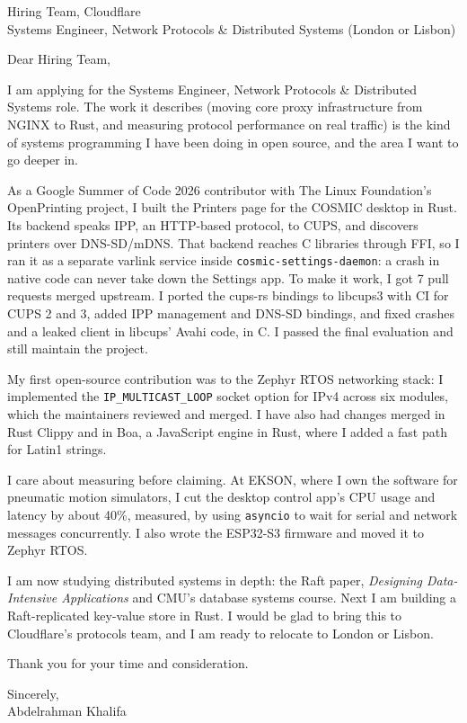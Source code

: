 \documentclass[10pt]{article}
\begin{document}
Hiring Team, Cloudflare\\
Systems Engineer, Network Protocols \& Distributed Systems (London or Lisbon)

Dear Hiring Team,

I am applying for the Systems Engineer, Network Protocols \& Distributed Systems role. The work it describes (moving core proxy infrastructure from NGINX to Rust, and measuring protocol performance on real traffic) is the kind of systems programming I have been doing in open source, and the area I want to go deeper in.

As a Google Summer of Code 2026 contributor with The Linux Foundation's OpenPrinting project, I built the Printers page for the COSMIC desktop in Rust. Its backend speaks IPP, an HTTP-based protocol, to CUPS, and discovers printers over DNS-SD/mDNS. That backend reaches C libraries through FFI, so I ran it as a separate varlink service inside \texttt{cosmic-settings-daemon}: a crash in native code can never take down the Settings app. To make it work, I got 7 pull requests merged upstream. I ported the cups-rs bindings to libcups3 with CI for CUPS 2 and 3, added IPP management and DNS-SD bindings, and fixed crashes and a leaked client in libcups' Avahi code, in C. I passed the final evaluation and still maintain the project.

My first open-source contribution was to the Zephyr RTOS networking stack: I implemented the \texttt{IP\_MULTICAST\_LOOP} socket option for IPv4 across six modules, which the maintainers reviewed and merged. I have also had changes merged in Rust Clippy and in Boa, a JavaScript engine in Rust, where I added a fast path for Latin1 strings.

I care about measuring before claiming. At EKSON, where I own the software for pneumatic motion simulators, I cut the desktop control app's CPU usage and latency by about 40\%, measured, by using \texttt{asyncio} to wait for serial and network messages concurrently. I also wrote the ESP32-S3 firmware and moved it to Zephyr RTOS.

I am now studying distributed systems in depth: the Raft paper, \emph{Designing Data-Intensive Applications} and CMU's database systems course. Next I am building a Raft-replicated key-value store in Rust. I would be glad to bring this to Cloudflare's protocols team, and I am ready to relocate to London or Lisbon.

Thank you for your time and consideration.

Sincerely,\\
Abdelrahman Khalifa
\end{document}
